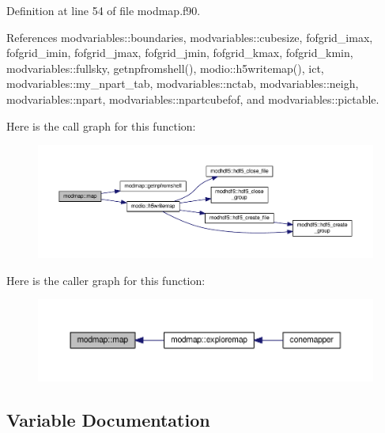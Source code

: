 Definition at line 54 of file modmap.\+f90.



References modvariables\+::boundaries, modvariables\+::cubesize, fofgrid\+\_\+imax, fofgrid\+\_\+imin, fofgrid\+\_\+jmax, fofgrid\+\_\+jmin, fofgrid\+\_\+kmax, fofgrid\+\_\+kmin, modvariables\+::fullsky, getnpfromshell(), modio\+::h5writemap(), ict, modvariables\+::my\+\_\+npart\+\_\+tab, modvariables\+::nctab, modvariables\+::neigh, modvariables\+::npart, modvariables\+::npartcubefof, and modvariables\+::pictable.



Here is the call graph for this function\+:\nopagebreak
\begin{figure}[H]
\begin{center}
\leavevmode
\includegraphics[width=350pt]{namespacemodmap_af6328324bc6aaca47018ded5f4c8e8cb_cgraph}
\end{center}
\end{figure}




Here is the caller graph for this function\+:\nopagebreak
\begin{figure}[H]
\begin{center}
\leavevmode
\includegraphics[width=350pt]{namespacemodmap_af6328324bc6aaca47018ded5f4c8e8cb_icgraph}
\end{center}
\end{figure}




\subsection{Variable Documentation}
